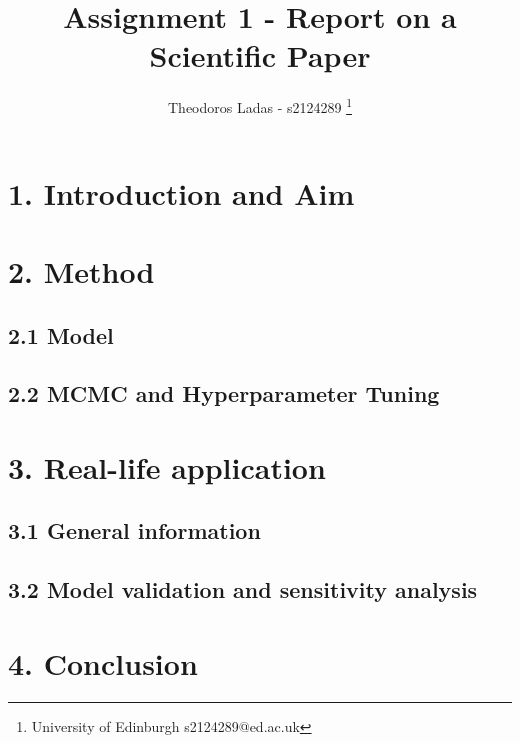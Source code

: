 \documentclass[fleqn, a4paper]{report}
\title{Assignment 1 - Report on a Scientific Paper}
\author{
Theodoros Ladas - s2124289 
\footnote{University of Edinburgh s2124289@ed.ac.uk}
}
\date{\parbox{\linewidth}{\centering%
  January 10, 2021\endgraf\bigskip
  Coordinator: Miguel de Carvalho\endgraf\medskip
  Dept.\ of Mathematics \endgraf
  University of Edinburgh}}
\begin{document}
\maketitle

\section*{1. Introduction and Aim}

\section*{2. Method}

\subsection*{2.1 Model}

\subsection*{2.2 MCMC and Hyperparameter Tuning}

\section*{3. Real-life application}

\subsection*{3.1 General information}

\subsection*{3.2 Model validation and sensitivity analysis}

\section*{4. Conclusion}



\end{document}
